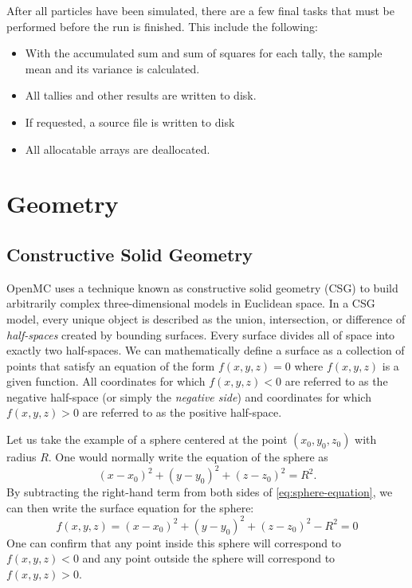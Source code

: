 After all particles have been simulated, there are a few final tasks that must
be performed before the run is finished. This include the following:
\begin{itemize}
\item With the accumulated sum and sum of squares for each tally, the sample
  mean and its variance is calculated.
\item All tallies and other results are written to disk.
\item If requested, a source file is written to disk
\item All allocatable arrays are deallocated.
\end{itemize}

\section{Geometry}

\subsection{Constructive Solid Geometry}

OpenMC uses a technique known as constructive solid geometry (CSG) to build
arbitrarily complex three-dimensional models in Euclidean space. In a CSG model,
every unique object is described as the union, intersection, or difference of
\emph{half-spaces} created by bounding surfaces. Every surface divides all of
space into exactly two half-spaces. We can mathematically define a surface as a
collection of points that satisfy an equation of the form $f(x,y,z) = 0$ where
$f(x,y,z)$ is a given function. All coordinates for which $f(x,y,z) < 0$ are
referred to as the negative half-space (or simply the \emph{negative side}) and
coordinates for which $f(x,y,z) > 0$ are referred to as the positive half-space.

Let us take the example of a sphere centered at the point $(x_0,y_0,z_0)$
with radius $R$. One would normally write the equation of the sphere as
\begin{equation}
  \label{eq:sphere-equation}
  (x - x_0)^2 + (y - y_0)^2 + (z - z_0)^2 = R^2.
\end{equation}
By subtracting the right-hand term from both sides of
\eqref{eq:sphere-equation}, we can then write the surface equation for the
sphere:
\begin{equation}
  \label{eq:surface-equation-sphere}
  f(x,y,z) = (x - x_0)^2 + (y - y_0)^2 + (z - z_0)^2 - R^2 = 0
\end{equation}
One can confirm that any point inside this sphere will correspond to
$f(x,y,z) < 0$ and any point outside the sphere will correspond to
$f(x,y,z) > 0$.

